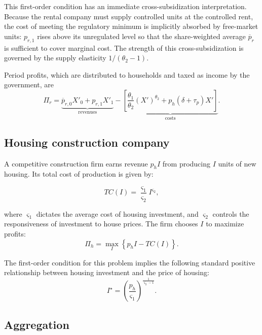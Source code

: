 \documentclass[parskip=full]{article}
\begin{document}
This first-order condition has an immediate cross-subsidization interpretation. Because the rental company must supply controlled units at the controlled rent, the cost of meeting the regulatory minimum is implicitly absorbed by free-market units: $p_{r,1}$ rises above its unregulated level so that the share-weighted average $\overline{p}_r$ is sufficient to cover marginal cost. The strength of this cross-subsidization is governed by the supply elasticity $1/(\theta_2 - 1)$.

Period profits, which are distributed to households and taxed as income by the government, are
\[
\Pi_r = \underbrace{\overline{p}_{r,0} X'_0 + p_{r,1} X'_1}_{\text{revenues}} - \underbrace{\left[\frac{\theta_1}{\theta_2}(X')^{\theta_2} + p_h(\delta + \tau_p) X'\right]}_{\text{costs}}.
\]

\subsection{Housing construction company}\label{sec:construction_company}

A competitive construction firm earns revenue $p_h I$ from producing $I$ units of new housing. Its total cost of production is given by:

\begin{equation*}\label{eq:total_cost_structure}
TC(I)=\frac{\varsigma_{1}}{\varsigma_{2}}I^{\varsigma_{2}},
\end{equation*}

\noindent where $\varsigma_{1}$ dictates the average cost of housing investment, and $\varsigma_{2}$ controls the responsiveness of investment to house prices. The firm chooses $I$ to maximize profits:
\begin{equation*}
\label{eq:construction_company_profits}
\Pi_h=\max_{I}\left\{p_hI-TC(I)\right\}.
\end{equation*}

\noindent The first-order condition for this problem implies the following standard positive relationship between housing investment and the price of housing:
\begin{equation}
\label{eq:construction_company_first_order_condition}
I^{\star}=\left(\frac{p_h}{\varsigma_{1}}\right)^{\frac{1}{\varsigma_{2}-1}}.
\end{equation}

\subsection{Aggregation}\label{subsection:aggregation}
\end{document}
